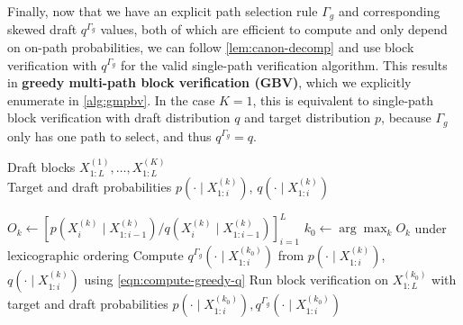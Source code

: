 \documentclass{article}
\theoremstyle{plain}
\theoremstyle{definition}
\theoremstyle{remark}
\begin{document}
Finally, now that we have an explicit path selection rule $\Gamma_g$ and corresponding skewed draft $q^{\Gamma_g}$ values, both of which are efficient to compute and only depend on on-path probabilities, we can follow \cref{lem:canon-decomp} and use block verification with $q^{\Gamma_g}$ for the valid single-path verification algorithm. This results in \textbf{greedy multi-path block verification (GBV)}, which we explicitly enumerate in \cref{alg:gmpbv}. In the case $K=1$, this is equivalent to single-path block verification with draft distribution $q$ and target distribution $p$, because $\Gamma_g$ only has one path to select, and thus $q^{\Gamma_g}=q$.



\begin{algorithm}[t]
\caption{Greedy Multi-Path Block Verification}
\label{alg:gmpbv}
\begin{algorithmic}[1]
\INPUT Draft blocks $X^{(1)}_{1:L},\ldots,X^{(K)}_{1:L}$ \\
Target and draft probabilities
$p(\cdot\mid X^{(k)}_{1:i})$, $q(\cdot\mid X^{(k)}_{1:i})$

    \STATE $O_k \gets \left[p(X^{(k)}_i\mid X^{(k)}_{1:i-1})/q(X^{(k)}_i\mid X^{(k)}_{1:i-1})\right]_{i=1}^{L}$
\ENDFOR
\STATE $k_0 \gets \arg\max_{k} O_k$ under lexicographic ordering
    \STATE Compute $q^{\Gamma_g}(\cdot\mid X^{(k_0)}_{1:i})$ from $p(\cdot\mid X^{(k)}_{1:i})$, $q(\cdot\mid X^{(k)}_{1:i})$ using \cref{eqn:compute-greedy-q}
\ENDFOR
\STATE Run block verification on $X^{(k_0)}_{1:L}$ with target and draft probabilities
$p(\cdot\mid X^{(k_0)}_{1:i}),q^{\Gamma_g}(\cdot\mid X^{(k_0)}_{1:i})$
\end{algorithmic}
\end{algorithm}
\end{document}
